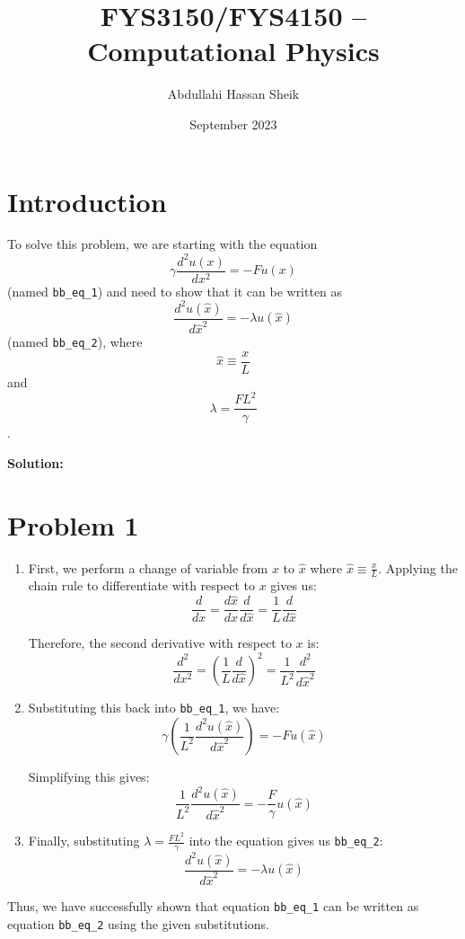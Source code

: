 \documentclass{article}
\title{FYS3150/FYS4150 – Computational Physics}
\author{Abdullahi Hassan Sheik }
\date{September 2023}
\begin{document}
\maketitle

\section{Introduction}

To solve this problem, we are starting with the equation 
\[ \gamma \frac{d^2 u(x)}{dx^2} = - F u(x) \] 
(named \texttt{bb\_eq\_1}) and need to show that it can be written as 
\[ \frac{d^2 u(\hat{x})}{d\hat{x}^2} = - \lambda u(\hat{x}) \] 
(named \texttt{bb\_eq\_2}), where 
\[ \hat{x} \equiv \frac{x}{L} \] 
and 
\[ \lambda = \frac{F L^2}{\gamma} \].

\textbf{Solution:}

\section*{Problem 1}
\begin{enumerate}
    \item First, we perform a change of variable from $x$ to $\hat{x}$ where $\hat{x} \equiv \frac{x}{L}$. Applying the chain rule to differentiate with respect to $x$ gives us:
    \[ \frac{d}{dx} = \frac{d\hat{x}}{dx} \frac{d}{d\hat{x}} = \frac{1}{L} \frac{d}{d\hat{x}} \]
    
    Therefore, the second derivative with respect to $x$ is:
    \[ \frac{d^2}{dx^2} = \left( \frac{1}{L} \frac{d}{d\hat{x}} \right)^2 = \frac{1}{L^2} \frac{d^2}{d\hat{x}^2} \]
    
    \item Substituting this back into \texttt{bb\_eq\_1}, we have:
    \[ \gamma \left( \frac{1}{L^2} \frac{d^2 u(\hat{x})}{d\hat{x}^2} \right) = - F u(\hat{x}) \]
    
    Simplifying this gives:
    \[ \frac{1}{L^2} \frac{d^2 u(\hat{x})}{d\hat{x}^2} = - \frac{F}{\gamma} u(\hat{x}) \]
    
    \item Finally, substituting $\lambda = \frac{F L^2}{\gamma}$ into the equation gives us \texttt{bb\_eq\_2}:
    \[ \frac{d^2 u(\hat{x})}{d\hat{x}^2} = - \lambda u(\hat{x}) \]
\end{enumerate}

Thus, we have successfully shown that equation \texttt{bb\_eq\_1} can be written as equation \texttt{bb\_eq\_2} using the given substitutions.
\end{document}

